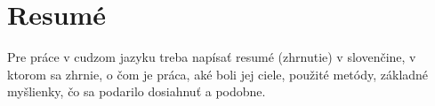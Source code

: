 \chapter*{Resumé}

Pre práce v cudzom jazyku treba napísať resumé (zhrnutie) v slovenčine, v ktorom sa zhrnie, o čom je práca, aké boli jej ciele, použité metódy, základné myšlienky, čo sa podarilo dosiahnuť a podobne.
